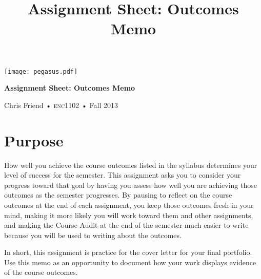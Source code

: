 \documentclass[11pt, oneside]{amsart}	%
\title[Outcomes Memo]{Assignment Sheet: Outcomes Memo}
\begin{document}
%
\thispagestyle{empty}

\begin{center}
\huge
{\texttt{[image: pegasus.pdf]}}

\textbf{Assignment Sheet: Outcomes Memo}

{\normalsize Chris Friend • \textsc{enc1102} • Fall 2013}
\end{center}
\vspace{\baselineskip}

\section{Purpose} %
\label{sec:purpose}
How well you achieve the course outcomes listed in the syllabus determines your level of success for the semester. This assignment asks you to consider your progress toward that goal by having you assess how well you are achieving those outcomes as the semester progresses. By pausing to reflect on the course outcomes at the end of each assignment, you keep those outcomes fresh in your mind, making it more likely you will work toward them and other assignments, and making the Course Audit at the end of the semester much easier to write because you will be used to writing about the outcomes.

In short, this assignment is practice for the cover letter for your final portfolio. Use this memo as an opportunity to document how your work displays evidence of the course outcomes.
\end{document}
